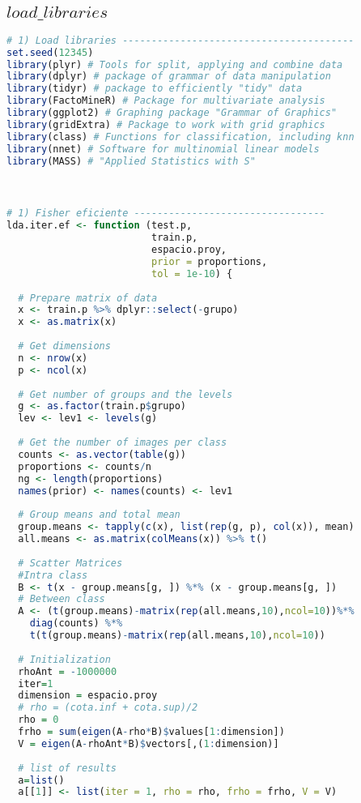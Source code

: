 \subsection{$load\_libraries$}
\begin{lstlisting}[language=R, basicstyle=\small]
# 1) Load libraries ----------------------------------------
set.seed(12345)
library(plyr) # Tools for split, applying and combine data
library(dplyr) # package of grammar of data manipulation
library(tidyr) # package to efficiently "tidy" data
library(FactoMineR) # Package for multivariate analysis
library(ggplot2) # Graphing package "Grammar of Graphics"
library(gridExtra) # Package to work with grid graphics
library(class) # Functions for classification, including knn
library(nnet) # Software for multinomial linear models
library(MASS) # "Applied Statistics with S"



# 1) Fisher eficiente ---------------------------------
lda.iter.ef <- function (test.p, 
                         train.p, 
                         espacio.proy,
                         prior = proportions,
                         tol = 1e-10) {
  
  # Prepare matrix of data
  x <- train.p %>% dplyr::select(-grupo)
  x <- as.matrix(x)
  
  # Get dimensions
  n <- nrow(x)
  p <- ncol(x)
  
  # Get number of groups and the levels
  g <- as.factor(train.p$grupo)
  lev <- lev1 <- levels(g)
  
  # Get the number of images per class
  counts <- as.vector(table(g))
  proportions <- counts/n
  ng <- length(proportions)
  names(prior) <- names(counts) <- lev1
  
  # Group means and total mean
  group.means <- tapply(c(x), list(rep(g, p), col(x)), mean)
  all.means <- as.matrix(colMeans(x)) %>% t()
  
  # Scatter Matrices 
  #Intra class
  B <- t(x - group.means[g, ]) %*% (x - group.means[g, ]) 
  # Between class
  A <- (t(group.means)-matrix(rep(all.means,10),ncol=10))%*% 
    diag(counts) %*% 
    t(t(group.means)-matrix(rep(all.means,10),ncol=10)) 
  
  # Initialization
  rhoAnt = -1000000
  iter=1
  dimension = espacio.proy
  # rho = (cota.inf + cota.sup)/2
  rho = 0
  frho = sum(eigen(A-rho*B)$values[1:dimension])
  V = eigen(A-rhoAnt*B)$vectors[,(1:dimension)]
  
  # list of results
  a=list()
  a[[1]] <- list(iter = 1, rho = rho, frho = frho, V = V) 
  

\end{lstlisting}
